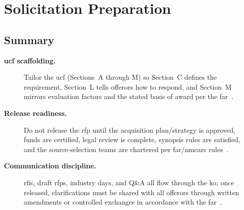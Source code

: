 \documentclass[../main.tex]{subfiles}
\begin{document}

\section{Solicitation Preparation}
\subsection{Summary}
\begin{description}
  \item[\textbf{\ac{ucf} scaffolding.}] Tailor the \ac{ucf} (Sections~A through M) so Section~C defines the requirement, Section~L tells offerors how to respond, and Section~M mirrors evaluation factors and the stated basis of award per the \ac{far}~\autocite{FAR,edo-3-2-2-solicitation-prep-2025}.
  \item[\textbf{Release readiness.}] Do not release the \ac{rfp} until the acquisition plan/strategy is approved, funds are certified, legal review is complete, synopsis rules are satisfied, and the source-selection teams are chartered per \ac{far}/\ac{nmcars} rules~\autocite{FAR,NMCARS,edo-3-2-2-solicitation-prep-2025}.
  \item[\textbf{Communication discipline.}] \acp{rfi}, draft \acp{rfp}, industry days, and Q\&A all flow through the \ac{ko}; once released, clarifications must be shared with all offerors through written amendments or controlled exchanges in accordance with the \ac{far}~\autocite{FAR,edo-3-2-2-solicitation-prep-2025}.
\end{description}
\end{document}
